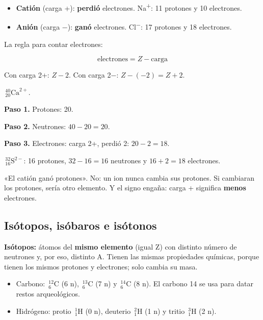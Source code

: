  
\begin{itemize}
  \item \textbf{Catión} (carga +): \textbf{perdió} electrones. Na\textsuperscript{+}: 11 protones y 10 electrones.
  \item \textbf{Anión} (carga \ensuremath{-}): \textbf{ganó} electrones. Cl\textsuperscript{\ensuremath{-}}: 17 protones y 18 electrones.
\end{itemize}
 

La regla para contar electrones:

 \[ \text{electrones} = Z - \text{carga} \] 

Con carga 2+: $Z - 2$. Con carga 2\ensuremath{-}: $Z - (-2) = Z + 2$.

  
\begin{ejemplo} $\,{}^{40}_{20}\text{Ca}^{2+}$.\par \textbf{Paso 1.} Protones: 20.\par \textbf{Paso 2.} Neutrones: $40 - 20 = 20$.\par \textbf{Paso 3.} Electrones: carga 2+, perdió 2: $20 - 2 = 18$.\end{ejemplo}
 
\begin{ejemplo} $\,{}^{32}_{16}\text{S}^{2-}$: 16 protones, $32 - 16 = 16$ neutrones y $16 + 2 = 18$ electrones.\end{ejemplo}
 
\begin{ojo} «El catión ganó protones». No: un ion nunca cambia sus protones. Si cambiaran los protones, sería otro elemento. Y el signo engaña: carga + significa \textbf{menos} electrones.\end{ojo}
\subsection{Isótopos, isóbaros e isótonos}
\textbf{Isótopos:} átomos del \textbf{mismo elemento} (igual Z) con distinto número de neutrones y, por eso, distinto A. Tienen las mismas propiedades químicas, porque tienen los mismos protones y electrones; solo cambia su masa.

 
\begin{itemize}
  \item Carbono: $\,{}^{12}_{6}\text{C}$ (6 n), $\,{}^{13}_{6}\text{C}$ (7 n) y $\,{}^{14}_{6}\text{C}$ (8 n). El carbono 14 se usa para datar restos arqueológicos.
  \item Hidrógeno: protio $\,{}^{1}_{1}\text{H}$ (0 n), deuterio $\,{}^{2}_{1}\text{H}$ (1 n) y tritio $\,{}^{3}_{1}\text{H}$ (2 n).
\end{itemize}
 


